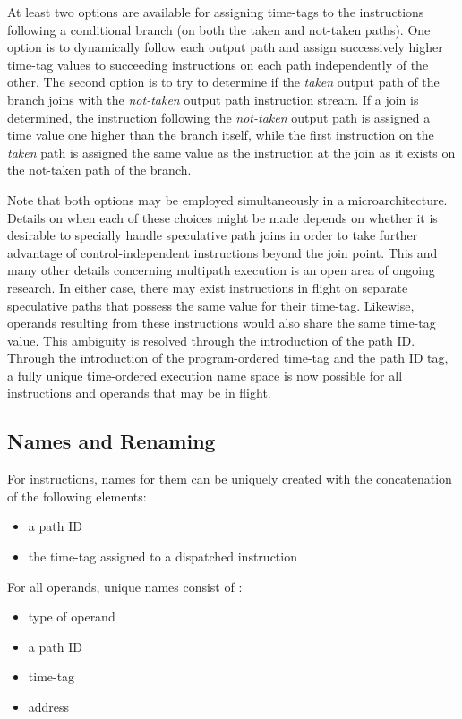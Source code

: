 \documentclass{book}
\begin{document}
At least two options are available for assigning time-tags
to the instructions following a conditional branch
(on both the taken and not-taken paths). 
One option is to dynamically follow
each output path and assign successively higher time-tag values
to succeeding instructions on each path independently of the other.
The second option is to try to determine if the \textit{taken} output path
of the branch joins with the \textit{not-taken} output path instruction
stream.
If a join is determined, the instruction following
the \textit{not-taken} output path is assigned a time value
one higher than the branch itself, while the first instruction
on the \textit{taken} path is assigned the same value as the
instruction at the join as it exists on the not-taken path of the branch.

Note that both options may be employed simultaneously in a 
microarchitecture.
Details on when each of these choices might be made depends on
whether it is desirable to specially handle speculative path joins 
in order to take further advantage of control-independent instructions
beyond the join point.  This and many other details concerning
multipath execution is an open area of ongoing research.
In either case, there may exist instructions in flight on separate
speculative paths
that possess the same value for their time-tag.  
Likewise,
operands resulting from these instructions would also share
the same time-tag value.
This ambiguity is resolved through the
introduction of the path ID.
Through the introduction of the program-ordered time-tag and the path ID tag,
a fully unique time-ordered execution name space is now possible for
all instructions and operands that may be in flight.
%
%
\subsection{Names and Renaming}
%
For instructions, names for them can be uniquely created
with the concatenation of the following elements:
%
\begin{itemize}
\vspace{-0.10in}
\item{a path ID}
\vspace{-0.10in}
\item{the time-tag assigned to a dispatched instruction}
\vspace{-0.10in}
\end{itemize}   
%
For all operands, unique names consist of :
%
\begin{itemize}
\vspace{-0.10in}
\item{type of operand}
\vspace{-0.10in}
\item{a path ID}
\vspace{-0.10in}
\item{time-tag}
\vspace{-0.10in}
\item{address}
\vspace{-0.10in}
\end{itemize}   
%
\end{document}
